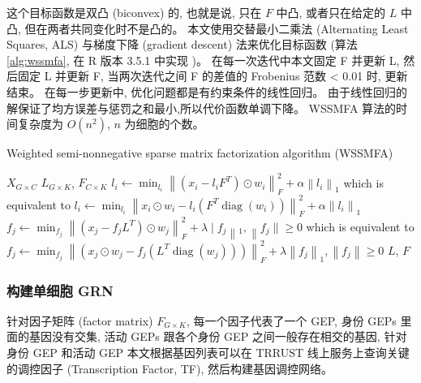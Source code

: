 这个目标函数是双凸 (biconvex) 的, 也就是说, 只在 $F$ 中凸, 或者只在给定的 $L$ 中凸, 但在两者共同变化时不是凸的。
本文使用交替最小二乘法 (Alternating Least Squares, ALS) 与梯度下降 (gradient descent) 法来优化目标函数 (算法 \ref{alg:wssmfa}, 
在 R 版本 3.5.1 中实现 )。
在每一次迭代中本文固定 F 并更新 L, 然后固定 L 并更新 F, 当两次迭代之间 F 的差值的 Frobenius 范数 < 0.01 时, 更新结束。
在每一步更新中, 优化问题都是有约束条件的线性回归。
由于线性回归的解保证了均方误差与惩罚之和最小,所以代价函数单调下降。
WSSMFA 算法的时间复杂度为 $O(n^2)$, $n$ 为细胞的个数。
\begin{algorithm}
    \renewcommand{\thealgorithm}{5-1}
    \caption{Weighted semi-nonnegative sparse matrix factorization algorithm (WSSMFA)}
    \label{alg:wssmfa}
    \begin{algorithmic}[1]
    \Require  $X_{G \times C}$                                   
    \Ensure $L_{G \times K}$, $F_{C \times K}$                
                \State $l_{i} \leftarrow \min _{l_{i}}\left\|\left(x_{i}-l_{i} F^{T}\right) \odot w_{i}\right\|_{F}^{2}+\alpha\left\|l_{i}\right\|_{1}$
                \State which is equivalent to 
                \State $l_{i} \leftarrow \min _{l_{i}}\left\|x_{i} \odot w_{i}-l_{i}\left(F^{T} \operatorname{diag}\left(w_{i}\right)\right)\right\|_{F}^{2}+\alpha\left\|l_{i}\right\|_{1}$
            \EndFor
                \State $f_{j} \leftarrow \min _{f_{j}}\left\|\left(x_{j}-f_{j} L^{T}\right) \odot w_{j}\right\|_{F}^{2}+\lambda \mid f_{j}\left\|_{1},\right\| f_{j} \| \geq 0$
                \State which is equivalent to 
                \State $f_{j} \leftarrow \min _{f_{j}}\left\|\left(x_{j} \odot w_{j}-f_{j}\left(L^{T} \operatorname{diag}\left(w_{j}\right)\right)\right)\right\|_{F}^{2}+\lambda\left\|f_{j}\right\|_{1},\left\|f_{j}\right\| \geq 0$
            \EndFor
        \EndWhile  
        \State \Return $L$, $F$        
  \end{algorithmic}
\end{algorithm}

\subsubsection{构建单细胞 GRN}

针对因子矩阵 (factor matrix) $F_{G \times K}$, 每一个因子代表了一个 GEP, 
身份 GEPs 里面的基因没有交集, 活动 GEPs 跟各个身份 GEP 之间一般存在相交的基因, 
针对身份 GEP 和活动 GEP 本文根据基因列表可以在 TRRUST 线上服务上查询关键的调控因子 (Transcription Factor, TF),
然后构建基因调控网络。


